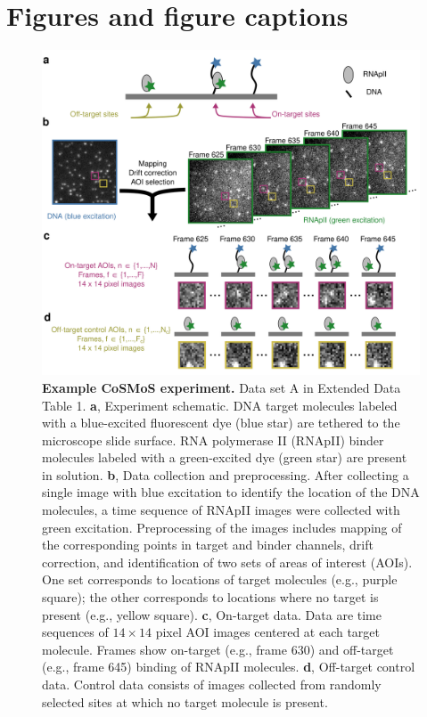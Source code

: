 \clearpage
\newpage
\section*{Figures and figure captions}
\pagebreak

\renewcommand{\figurename}{Fig.}

\begin{figure}[h]
\centering
\includegraphics[width=145mm]{figures/figure1/figure1.png}
\caption{\textbf{Example CoSMoS experiment.} Data set A in Extended Data Table 1. \textbf{a}, Experiment schematic. DNA target molecules labeled with a blue-excited fluorescent dye (blue star) are tethered to the microscope slide surface. RNA polymerase II (RNApII) binder molecules labeled with a green-excited dye (green star) are present in solution. \textbf{b}, Data collection and preprocessing. After collecting a single image with blue excitation to identify the location of the DNA molecules, a time sequence of RNApII images were collected with green excitation.  Preprocessing of the images includes mapping of the corresponding points in target and binder channels, drift correction, and identification of two sets of areas of interest (AOIs).  One set corresponds to locations of target molecules (e.g., purple square); the other corresponds to locations where no target is present (e.g., yellow square). \textbf{c}, On-target data. Data are time sequences of $14 \times 14$ pixel AOI images centered at each target molecule. Frames show on-target (e.g., frame 630) and off-target (e.g., frame 645) binding of RNApII molecules. \textbf{d}, Off-target control data. Control data consists of images collected from randomly selected sites at which no target molecule is present. }
\label{fig:cosmos_experiment}
\end{figure}

